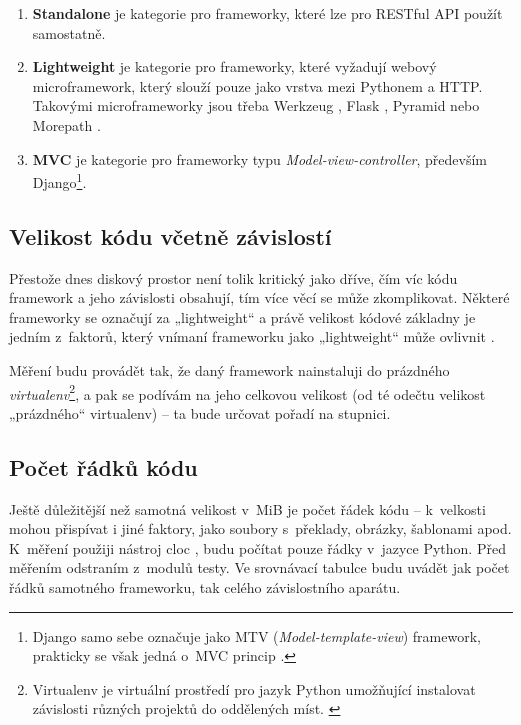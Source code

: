 \begin{enumerate}
\def\labelenumi{\arabic{enumi}.}
\tightlist
\item
  \textbf{Standalone} je kategorie pro frameworky, které lze pro RESTful API použít samostatně.
\item
  \textbf{Lightweight} je kategorie pro frameworky, které vyžadují webový microframework, který slouží pouze jako vrstva mezi Pythonem a HTTP. Takovými microframeworky jsou třeba Werkzeug \autocite{werkzeug}, Flask \autocite{flask}, Pyramid \autocite{pyramid} nebo Morepath \autocite{morepath}.
\item
  \textbf{MVC} je kategorie pro frameworky typu \emph{Model-view-controller}, především Django\footnote{Django samo sebe označuje jako MTV (\emph{Model-template-view}) framework, prakticky se však jedná o~MVC princip \autocite{djangobook}.}.
\end{enumerate}

\subsection{Velikost kódu včetně závislostí}\label{velikost-kuxf3du-vux10detnux11b-zuxe1vislostuxed}

Přestože dnes diskový prostor není tolik kritický jako dříve, čím víc kódu framework a jeho závislosti obsahují, tím více věcí se může zkomplikovat. Některé frameworky se označují za „lightweight“ a právě velikost kódové základny je jedním z~faktorů, který vnímaní frameworku jako „lightweight“ může ovlivnit \autocite{lightweight}.

Měření budu provádět tak, že daný framework nainstaluji do prázdného \emph{virtualenv}\footnote{Virtualenv je virtuální prostředí pro jazyk Python umožňující instalovat závislosti různých projektů do oddělených míst. \autocite{virtualenv}}, a pak se podívám na jeho celkovou velikost (od té odečtu velikost „prázdného“ virtualenv) -- ta bude určovat pořadí na stupnici.

\subsection{Počet řádků kódu}\label{poux10det-ux159uxe1dkux16f-kuxf3du}

Ještě důležitější než samotná velikost v~MiB je počet řádek kódu -- k~velkosti mohou přispívat i jiné faktory, jako soubory s~překlady, obrázky, šablonami apod. K~měření použiji nástroj cloc \autocite{cloc}, budu počítat pouze řádky v~jazyce Python. Před měřením odstraním z~modulů testy. Ve srovnávací tabulce budu uvádět jak počet řádků samotného frameworku, tak celého závislostního aparátu.

